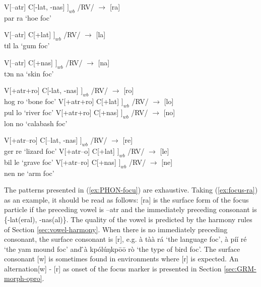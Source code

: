 \begin{exe}
\ex\label{ex:PHON-focu} 
\begin{xlist}
\ex\label{ex:focus-ra} 
 V[{\sc --atr}]  C[{\sc -lat}, {\sc -nas}]  $]_{wb}$ /RV/   $\rightarrow$ [ra] 
\\ 
{\sls par ra} {\rm  `hoe {\sc foc}'}

\ex\label{ex:} 
 V[{\sc --atr}]  C[{\sc +lat}]   $]_{wb}$ /RV/   $\rightarrow$ [la] \\
{\sls tɪl la} {\rm  `gum {\sc foc}'}

\ex\label{ex:}
 V[{\sc --atr}] C[{\sc +nas}]   $]_{wb}$  /RV/   $\rightarrow$ [na]\\
 {\sls tɔn na}   {\rm `skin {\sc foc}'}

\ex\label{ex:} 
 V[{\sc +atr}{\sc +ro}]  C[{\sc -lat}, {\sc -nas}] $]_{wb}$  /RV/   
$\rightarrow$ [ro] \\
 {\sls hog ro}   {\rm `bone {\sc foc}'}
\ex\label{ex:} 
  V[{\sc +atr}{\sc +ro}]  C[{\sc +lat}] $]_{wb}$  /RV/   $\rightarrow$ [lo] \\
 {\sls pul lo}   {\rm `river {\sc foc}'}
\ex\label{ex:}
  V[{\sc +atr}{\sc +ro}]  C[{\sc +nas}] $]_{wb}$ /RV/   $\rightarrow$ [no]\\
 {\sls lon no}   {\rm `calabash {\sc foc}'}

\ex\label{ex:} 
  V[{\sc +atr}{\sc --ro}]  C[{\sc --lat}, {\sc -nas}] $]_{wb}$  /RV/   
$\rightarrow$ [re] \\
 {\sls ger re}   {\rm `lizard {\sc foc}'}
\ex\label{ex:} 
  V[{\sc +atr}{\sc --o}] C[{\sc +lat}]  $]_{wb}$  /RV/   $\rightarrow$ [le] \\
 {\sls bil le}   {\rm `grave {\sc foc}'}
\ex\label{ex:}
 V[{\sc +atr}{\sc --ro}] C[{\sc +nas}]   $]_{wb}$  /RV/   $\rightarrow$ [ne]\\
 {\sls nen ne}   {\rm `arm {\sc foc}'}



\end{xlist}

\end{exe}


The patterns presented in (\ref{ex:PHON-focu}) are exhaustive. Taking
(\ref{ex:focus-ra}) as an example, it should be read as follows: [ra] is the
surface form of the focus particle if the preceding vowel is   {\sc --atr} and
the immediately preceding consonant is \{{\sc -lat(eral), -nas(al)}\}. The
quality
of the vowel is predicted by the harmony rules of Section
\ref{sec:vowel-harmony}.  When there is
no immediately preceding consonant,  the surface consonant is [r], e.g. {\sls à
tàà
rá} `the language {\sc foc}', {\sls  à píí ré} `the yam mound {\sc foc}' 
and {\sls 
̂à kpólúŋkpōō rò} `the type of bird {\sc foc}'.   The surface consonant  
[{\sls w}] is
sometimes found in  environments where  [{\sls r}] is expected. An 
alternation[{\sls w}] - [{\sls r}] as onset of the focus marker is presented in
Section \ref{sec:GRM-morph-opro}.


